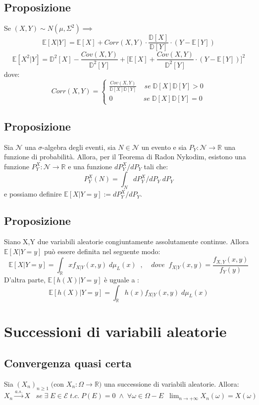 \documentclass{article}
\begin{document}
\subsection*{Proposizione}
Se $(X,Y) \sim N(\mu, \Sigma^{2}) \implies$
\[ \mathbb{E}[X|Y] = \mathbb{E}[X] + Corr(X,Y)\cdot \frac{\mathbb{D}[X]}{\mathbb{D}[Y]} \cdot (Y-\mathbb{E}[Y]) \]
\[ \mathbb{E}[X^{2}|Y] = \mathbb{D}^{2}[X] - \frac{Cov(X,Y)}{\mathbb{D}^{2}[Y]} + \Big[\mathbb{E}[X] + \frac{Cov(X,Y)}{\mathbb{D}^{2}[Y]} \cdot (Y - \mathbb{E}[Y])\Big]^{2} \]
dove:
\[ Corr(X,Y) =
\begin{cases}
\frac{Cov(X,Y)}{\mathbb{D}[X] \mathbb{D}[Y]} \; \; \; \; se \; \mathbb{D}[X] \mathbb{D}[Y] > 0\\
0 \; \; \; \; \; \; \; \; \; \; \; \; \; \; \; \; se \; \mathbb{D}[X] \mathbb{D}[Y] = 0
\end{cases}
\]

\subsection*{Proposizione}
Sia $\mathcal{N}$ una $\sigma$-algebra degli eventi, sia $N \in \mathcal{N}$ un evento e sia $P_{Y}: \mathcal{N} \to \mathbb{R}$ una funzione di probabilità. Allora, per il Teorema di Radon Nykodim, esistono una funzione $P_{Y}^{X}: \mathcal{N} \to \mathbb{R}$ e una funzione $dP_{Y}^{X}/dP_{Y}$ tali che:
\[ P_{Y}^{X}(N) = \int_{N}^{}dP_{Y}^{X}/dP_{Y} \; dP_{Y} \]
e possiamo definire $\mathbb{E}[X|Y=y] := dP_{Y}^{X}/dP_{Y}$.

\subsection*{Proposizione}
Siano X,Y due variabili aleatorie congiuntamente assolutamente continue. Allora $\mathbb{E}[X|Y=y]$ può essere definita nel seguente modo:
\[ \mathbb{E}[X|Y=y] = \int_{\mathbb{R}}^{}x f_{X|Y}(x,y) \; d\mu_{L}(x) \; \; , \; \; \; \; dove \; \; f_{X|Y}(x,y) = \frac{f_{X,Y}(x,y)}{f_{Y}(y)} \]
D'altra parte, $\mathbb{E}[h(X)|Y=y]$ è uguale a :
\[ \mathbb{E}[h(X)|Y=y] = \int_{\mathbb{R}}^{}h(x) f_{X|Y}(x,y) \; d\mu_{L}(x) \]

\section*{Successioni di variabili aleatorie}
\subsection*{Convergenza quasi certa}
Sia $(X_{n})_{n \geq 1} \; ($con $ X_{n}: \Omega \to \mathbb{R})$ una successione di variabili aleatorie. Allora:\\
$X_{n} \xrightarrow[]{a.s.}X \; \; \; se \; \exists \; E \in \mathcal{E} \; t.c.\; P(E)=0 \; \wedge \; \forall \omega \in \Omega - E \; \; \lim_{n\to +\infty}X_{n}(\omega) = X(\omega)$
\end{document}
